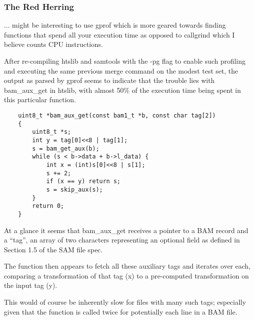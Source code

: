 \subsubsection{The Red Herring}

... might be interesting to use gprof which is more
geared towards finding functions that spend all your execution time as opposed
to callgrind which I believe counts CPU instructions.

After re-compiling htslib and samtools with the -pg flag to enable such
profiling and executing the same previous merge command on the modest test set,
the output as parsed by gprof seems to indicate that the trouble lies with
bam\_aux\_get in htslib, with almost 50\% of the execution time being spent in
this particular function.

\begin{verbatim}
    uint8_t *bam_aux_get(const bam1_t *b, const char tag[2])
    {
        uint8_t *s;
        int y = tag[0]<<8 | tag[1];
        s = bam_get_aux(b);
        while (s < b->data + b->l_data) {
            int x = (int)s[0]<<8 | s[1];
            s += 2;
            if (x == y) return s;
            s = skip_aux(s);
        }
        return 0;
    }
\end{verbatim}


At a glance it seems that bam\_aux\_get receives a pointer to a BAM record and a
“tag”, an array of two characters representing an optional field as defined in
Section 1.5 of the SAM file spec.

The function then appears to fetch all these auxiliary tags and iterates over
each, comparing a transformation of that tag (x) to a pre-computed
transformation on the input tag (y).

This would of course be inherently slow for files with many such tags;
especially given that the function is called twice for potentially each line in
a BAM file.


